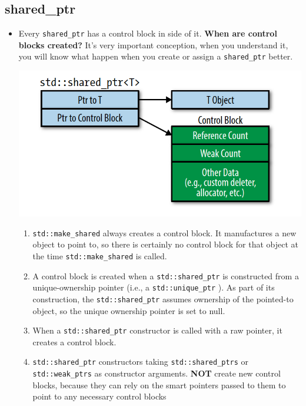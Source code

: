 \documentclass[a4paper,11pt,twoside]{book}
\begin{document}
\subsection{shared\_ptr}
\begin{itemize}
\item Every \texttt{shared\_ptr} has a control block in side of it. \textbf{When are control blocks created?}  It's very important conception, when you understand it, you will know what happen when you create or assign a \texttt{shared\_ptr} better. 
\begin{center}
\includegraphics[scale=0.6]{pics/shared.png}
\end{center}


\begin{enumerate}
	\item \texttt{std::make\_shared}  always creates a control block. It manufactures a new object to point to, so there is certainly no control block for that object at the time \texttt{std::make\_shared} is called.
	
	\item A control block is created when a \texttt{std::shared\_ptr} is constructed from a unique-ownership pointer (i.e., a \texttt{std::unique\_ptr} ). As part of its construction, the \texttt{std::shared\_ptr} assumes ownership of the pointed-to object, so the unique ownership pointer is set to null.
	
	\item When a \texttt{std::shared\_ptr} constructor is called with a raw pointer, it creates a control block.
	
	\item \texttt{std::shared\_ptr} constructors taking \texttt{std::shared\_ptrs} or \texttt{std::weak\_ptrs} as constructor arguments. \textbf{NOT} create new control blocks, because they can rely on the smart pointers passed to them to point to any necessary control blocks
	

\end{enumerate}
\end{itemize}
\end{document}
